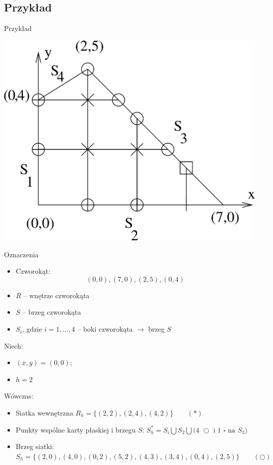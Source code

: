 \subsection{Przykład}

\begin{frame}{Przykład}
  \centerline{\includegraphics[height = 0.85 \textheight]{img/23/przyklad}}
\end{frame}

\begin{frame}
  \begin{block}{Oznaczenia}
    \begin{itemize}
      \item Czworokąt:
            $$(0,0), (7,0), (2,5), (0,4)$$
      \item $R$ -- wnętrze czworokąta
      \item $S$ -- brzeg czworokąta
      \item $S_i$, gdzie $i=1,\dots , 4$ -- boki czworokąta $\rightarrow$ brzeg $S$
    \end{itemize}
  \end{block}
\end{frame}

\begin{frame}
  Niech:
  \begin{itemize}
    \item $(\overline{x},\overline{y}) = (0,0);$
    \item $h=2$
  \end{itemize}

  Wówczas:
  \begin{itemize}
    \item Siatka wewnętrzna $R_h = \{(2,2),(2,4),(4,2)\} \qquad (*)$
    \item Punkty wspólne karty płaskiej i brzegu $S$: $S_h^* = S_i \bigcup S_2 \bigcup \text{(4 $\bigcirc$ i 1 $\square$ na $S_3$)}$ %
    \item Brzeg siatki: $S_h = \{ (2,0),(4,0),(0,2),(5,2),(4,3),(3,4),(0,4),(2,5) \} \qquad (\bigcirc)$
  \end{itemize}
\end{frame}

